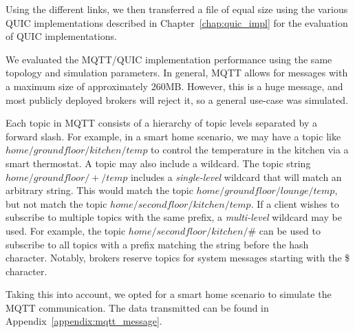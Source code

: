 Using the different links, we then transferred a file of equal size using the various QUIC implementations described in Chapter~\ref{chap:quic_impl} for the evaluation of QUIC implementations.

We evaluated the MQTT/QUIC implementation performance using the same topology and simulation parameters.
In general, MQTT allows for messages with a maximum size of approximately 260MB.
However, this is a huge message, and most publicly deployed brokers will reject it, so a general use-case was simulated.

Each topic in MQTT consists of a hierarchy of topic levels separated by a forward slash.
For example, in a smart home scenario, we may have a topic like $home/groundfloor/kitchen/temp$ to control the temperature in the kitchen via a smart thermostat.
A topic may also include a wildcard.
The topic string $home/groundfloor/+/temp$ includes a \textit{single-level} wildcard that will match an arbitrary string.
This would match the topic $home/groundfloor/lounge/temp$, but not match the topic $home/secondfloor/kitchen/temp$.
If a client wishes to subscribe to multiple topics with the same prefix, a \textit{multi-level} wildcard may be used.
For example, the topic $home/secondfloor/kitchen/\#$ can be used to subscribe to all topics with a prefix matching the string before the hash character.
Notably, brokers reserve topics for system messages starting with the \$ character.

Taking this into account, we opted for a smart home scenario to simulate the MQTT communication.
The data transmitted can be found in Appendix~\ref{appendix:mqtt_message}.